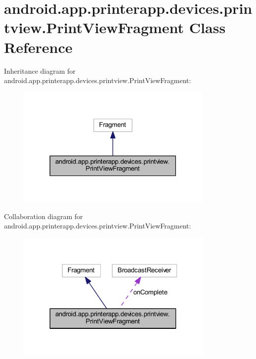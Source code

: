 \hypertarget{classandroid_1_1app_1_1printerapp_1_1devices_1_1printview_1_1_print_view_fragment}{}\section{android.\+app.\+printerapp.\+devices.\+printview.\+Print\+View\+Fragment Class Reference}
\label{classandroid_1_1app_1_1printerapp_1_1devices_1_1printview_1_1_print_view_fragment}


Inheritance diagram for android.\+app.\+printerapp.\+devices.\+printview.\+Print\+View\+Fragment\+:
\nopagebreak
\begin{figure}[H]
\begin{center}
\leavevmode
\includegraphics[width=271pt]{classandroid_1_1app_1_1printerapp_1_1devices_1_1printview_1_1_print_view_fragment__inherit__graph}
\end{center}
\end{figure}


Collaboration diagram for android.\+app.\+printerapp.\+devices.\+printview.\+Print\+View\+Fragment\+:
\nopagebreak
\begin{figure}[H]
\begin{center}
\leavevmode
\includegraphics[width=273pt]{classandroid_1_1app_1_1printerapp_1_1devices_1_1printview_1_1_print_view_fragment__coll__graph}
\end{center}
\end{figure}
